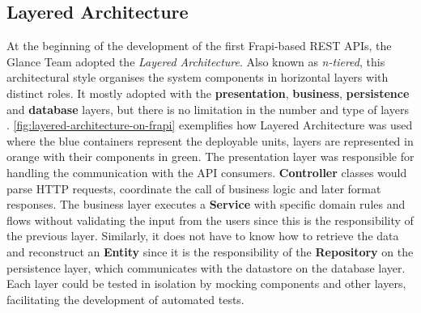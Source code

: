\subsection{Layered Architecture}
\label{sec:layered-architecture}

At the beginning of the development of the first Frapi-based REST APIs, the Glance Team adopted the \textit{Layered Architecture}. Also known as \textit{n-tiered}, this architectural style organises the system components in horizontal layers with distinct roles. It mostly adopted with the \textbf{presentation}, \textbf{business}, \textbf{persistence} and \textbf{database} layers, but there is no limitation in the number and type of layers \cite{richards-architecture}. \autoref{fig:layered-architecture-on-frapi} exemplifies how Layered Architecture was used where the blue containers represent the deployable units, layers are represented in orange with their components in green. The presentation layer was responsible for handling the communication with the API consumers. \textbf{Controller} classes would parse HTTP requests, coordinate the call of business logic and later format responses. The business layer executes a \textbf{Service} with specific domain rules and flows without validating the input from the users since this is the responsibility of the previous layer. Similarly, it does not have to know how to retrieve the data and reconstruct an \textbf{Entity} since it is the responsibility of the \textbf{Repository} on the persistence layer, which communicates with the datastore on the database layer. Each layer could be tested in isolation by mocking components and other layers, facilitating the development of automated tests.

